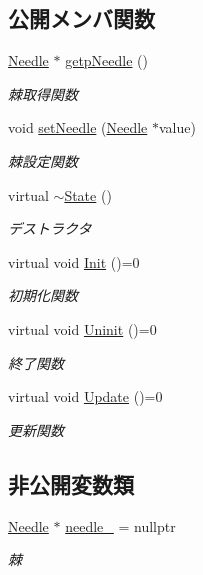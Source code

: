 \subsection*{公開メンバ関数}
\begin{DoxyCompactItemize}
\item 
\mbox{\hyperlink{class_needle}{Needle}} $\ast$ \mbox{\hyperlink{class_needle_1_1_state_a8e3a82791c1242b2a5ef4b16071be09b}{getp\+Needle}} ()
\begin{DoxyCompactList}\small\item\em 棘取得関数 \end{DoxyCompactList}\item 
void \mbox{\hyperlink{class_needle_1_1_state_ad2844f0add0bb21507269c231baf2e9d}{set\+Needle}} (\mbox{\hyperlink{class_needle}{Needle}} $\ast$value)
\begin{DoxyCompactList}\small\item\em 棘設定関数 \end{DoxyCompactList}\item 
virtual \mbox{\hyperlink{class_needle_1_1_state_a5d90c3976391f5173fd2d9960cdfa157}{$\sim$\+State}} ()
\begin{DoxyCompactList}\small\item\em デストラクタ \end{DoxyCompactList}\item 
virtual void \mbox{\hyperlink{class_needle_1_1_state_a0d1012f643be1fc3df2b977dc101fd6b}{Init}} ()=0
\begin{DoxyCompactList}\small\item\em 初期化関数 \end{DoxyCompactList}\item 
virtual void \mbox{\hyperlink{class_needle_1_1_state_a8a4795ac9a90c7497ab8d039562691d2}{Uninit}} ()=0
\begin{DoxyCompactList}\small\item\em 終了関数 \end{DoxyCompactList}\item 
virtual void \mbox{\hyperlink{class_needle_1_1_state_af1455c890b581081c6135fe091984717}{Update}} ()=0
\begin{DoxyCompactList}\small\item\em 更新関数 \end{DoxyCompactList}\end{DoxyCompactItemize}
\subsection*{非公開変数類}
\begin{DoxyCompactItemize}
\item 
\mbox{\hyperlink{class_needle}{Needle}} $\ast$ \mbox{\hyperlink{class_needle_1_1_state_a0e6c31e981a2dd5317e009351c389842}{needle\+\_\+}} = nullptr
\begin{DoxyCompactList}\small\item\em 棘 \end{DoxyCompactList}\end{DoxyCompactItemize}



